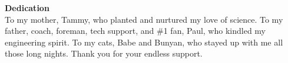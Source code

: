\hspace{0pt}\vfill
{\centering\large\textbf{Dedication}\\
\normalsize\vspace{\baselineskip}
 To my mother, Tammy, who planted and nurtured my love of science. To my father, coach, foreman, tech support, and \#1 fan, Paul, who kindled my engineering spirit. To my cats, Babe and Bunyan, who stayed up with me all those long nights. Thank you for your endless support.\par
 }
\vfill\hspace{0pt}